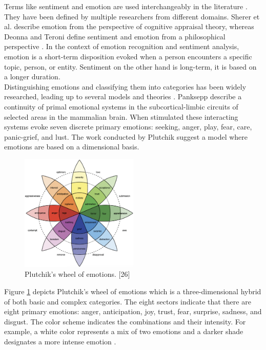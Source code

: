 Terms like sentiment and emotion are used interchangeably in the literature \cite{sentiment_emotion_difference_munezero2014they}. They have been defined by multiple researchers from different domains. Sherer et al. \cite{scherer2005emotions} describe emotion from the perspective of cognitive appraisal theory, whereas Deonna and Teroni \cite{deonna2012emotions} define sentiment and emotion from a philosophical perspective \cite{MSA_review1_SOLEYMANI20173}. In the context of emotion recognition and sentiment analysis, emotion is a short-term disposition evoked when a person encounters a specific topic, person, or entity. Sentiment on the other hand is long-term, it is based on a longer duration.  \\

Distinguishing emotions and classifying them into categories has been widely researched, leading up to several models and theories \cite{HP_RPP} \cite{cross_cultural}. Panksepp \cite{panksepp_book} describe a continuity of primal emotional systems in the subcortical-limbic circuits of selected areas in the mammalian brain. When stimulated these interacting systems evoke seven discrete primary emotions: seeking, anger, play, fear, care, panic-grief, and lust. The work conducted by Plutchik \cite{plutchik_model} suggest a model where emotions are based on a dimensional basis. 
%
\begin{figure}[h]
  \centering
  \includegraphics[width=0.5\textwidth]{figures/plutchiks_model.png}
  \caption{Plutchik's wheel of emotions. [26]}
  \label{fig:plutchik}
\end{figure}
%
Figure \ref{fig:plutchik} depicts Plutchik's wheel of emotions which is a three-dimensional hybrid of both basic and complex categories. The eight sectors indicate that there are eight primary emotions: anger, anticipation, joy, trust, fear, surprise, sadness, and disgust. The color scheme indicates the combinations and their intensity. For example, a white color represents a mix of two emotions and a darker shade designates a more intense emotion \cite{HP_RPP}. \\

